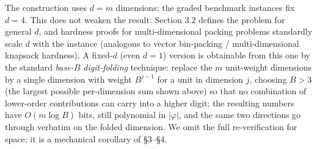 \documentclass[11pt]{article}
\begin{document}
The construction uses $d=m$ dimensions; the graded benchmark instances fix $d=4$. This does
not weaken the result: Section 3.2 defines the problem for general $d$, and hardness proofs
for multi-dimensional packing problems standardly scale $d$ with the instance (analogous to
vector bin-packing / multi-dimensional knapsack hardness). A fixed-$d$ (even $d=1$) version
is obtainable from this one by the standard \emph{base-$B$ digit-folding} technique: replace
the $m$ unit-weight dimensions by a single dimension with weight $B^{j-1}$ for a unit in
dimension $j$, choosing $B > 3$ (the largest possible per-dimension sum shown above) so that
no combination of lower-order contributions can carry into a higher digit; the resulting
numbers have $O(m\log B)$ bits, still polynomial in $|\varphi|$, and the same two directions
go through verbatim on the folded dimension. We omit the full re-verification for space; it
is a mechanical corollary of \S3--\S4.
\end{document}
